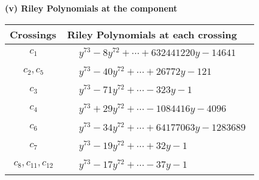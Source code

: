 \documentclass[1p]{elsarticle_modified}
\theoremstyle{definition}
\begin{document}
\newpage\renewcommand{\arraystretch}{1}
\flushleft \textbf{(v) Riley Polynomials at the component}\newline \\
\begin{tabular}{m{50pt}|m{274pt}}
Crossings & \hspace{64pt}Riley Polynomials at each crossing \\
\hline $$\begin{aligned}c_{1}\end{aligned}$$&$\begin{aligned}
&y^{73}-8 y^{72}+\cdots+632441220 y-14641
\end{aligned}$\\
\hline $$\begin{aligned}c_{2},c_{5}\end{aligned}$$&$\begin{aligned}
&y^{73}-40 y^{72}+\cdots+26772 y-121
\end{aligned}$\\
\hline $$\begin{aligned}c_{3}\end{aligned}$$&$\begin{aligned}
&y^{73}-71 y^{72}+\cdots-323 y-1
\end{aligned}$\\
\hline $$\begin{aligned}c_{4}\end{aligned}$$&$\begin{aligned}
&y^{73}+29 y^{72}+\cdots-1084416 y-4096
\end{aligned}$\\
\hline $$\begin{aligned}c_{6}\end{aligned}$$&$\begin{aligned}
&y^{73}-34 y^{72}+\cdots+64177063 y-1283689
\end{aligned}$\\
\hline $$\begin{aligned}c_{7}\end{aligned}$$&$\begin{aligned}
&y^{73}-19 y^{72}+\cdots+32 y-1
\end{aligned}$\\
\hline $$\begin{aligned}c_{8},c_{11},c_{12}\end{aligned}$$&$\begin{aligned}
&y^{73}-17 y^{72}+\cdots-37 y-1
\end{aligned}$\\

\end{tabular}
\end{document}
